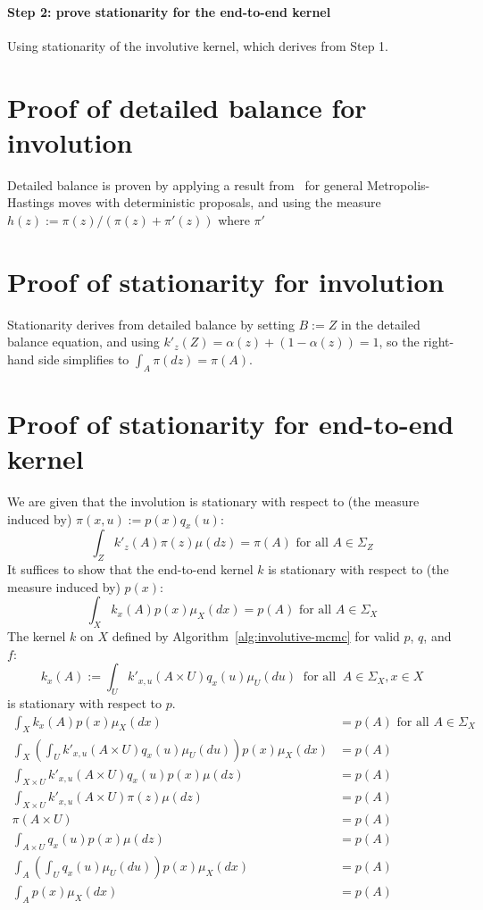 \documentclass[twoside]{article}
\begin{document}
\paragraph{Step 2: prove stationarity for the end-to-end kernel}
Using stationarity of the involutive kernel, which derives from Step 1.

\section{Proof of detailed balance for involution}
Detailed balance is proven by applying a result from~\citet{tierney1998note} for general Metropolis-Hastings moves with deterministic proposals, and using the measure $h(z) := \pi(z) / (\pi(z) + \pi'(z))$ where $\pi'$ 

\section{Proof of stationarity for involution}
Stationarity derives from detailed balance by setting $B := Z$ in the detailed balance equation, and using $k'_z(Z) = \alpha(z) + (1 - \alpha(z)) =1$, so the right-hand side simplifies to $\int_A \pi(dz) = \pi(A)$.

\section{Proof of stationarity for end-to-end kernel}
We are given that the involution is stationary with respect to (the measure induced by) $\pi(x, u) := p(x) q_x(u)$:
\[
\int_Z k'_z(A) \pi(z) \mu(dz) = \pi(A) \mbox{ for all } A \in \Sigma_Z
\]
It suffices to show that the end-to-end kernel $k$ is stationary with respect to (the measure induced by) $p(x)$:
\[
\int_X k_x(A) p(x) \mu_X(dx) = p(A) \mbox{ for all } A \in \Sigma_X
\]
The kernel $k$ on $X$ defined by Algorithm~\ref{alg:involutive-mcmc} for valid $p$, $q$, and $f$:
\[
k_x(A) := \int_U k'_{x,u}(A \times U) q_x(u) \mu_U(du) \;\; \mbox{for all} \;\; A \in \Sigma_X, x \in X
\]
is stationary with respect to $p$.
\begin{align*}
    \int_X k_x(A) p(x) \mu_X(dx) &= p(A) \mbox{ for all } A \in \Sigma_X\\
    \int_X \left( \int_U k'_{x,u}(A \times U) q_x(u) \mu_U(du) \right) p(x) \mu_X(dx) &= p(A)\\
    \int_{X \times U} k'_{x,u}(A \times U) q_x(u) p(x) \mu(dz) &= p(A)\\
    \int_{X \times U} k'_{x,u}(A \times U) \pi(z) \mu(dz) &= p(A)\\
    \pi(A \times U) &= p(A)\\
    \int_{A \times U} q_x(u) p(x) \mu(dz) &= p(A)\\
    \int_A \left( \int_U q_x(u) \mu_U(du) \right) p(x) \mu_X(dx) &= p(A)\\
    \int_A p(x) \mu_X(dx) &= p(A)
\end{align*}
\end{document}
